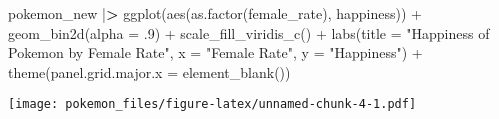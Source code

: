 \documentclass[
]{article}
\newenvironment{Shaded}{\begin{snugshade}}{\end{snugshade}}
\newcommand{\AttributeTok}[1]{\textcolor[rgb]{0.77,0.63,0.00}{#1}}
\newcommand{\DecValTok}[1]{\textcolor[rgb]{0.00,0.00,0.81}{#1}}
\newcommand{\ErrorTok}[1]{\textcolor[rgb]{0.64,0.00,0.00}{\textbf{#1}}}
\newcommand{\FunctionTok}[1]{\textcolor[rgb]{0.00,0.00,0.00}{#1}}
\newcommand{\NormalTok}[1]{#1}
\newcommand{\SpecialCharTok}[1]{\textcolor[rgb]{0.00,0.00,0.00}{#1}}
\newcommand{\StringTok}[1]{\textcolor[rgb]{0.31,0.60,0.02}{#1}}
\begin{document}
\begin{Shaded}
\begin{Highlighting}[]
\NormalTok{pokemon\_new }\SpecialCharTok{|}\ErrorTok{\textgreater{}} \FunctionTok{ggplot}\NormalTok{(}\FunctionTok{aes}\NormalTok{(}\FunctionTok{as.factor}\NormalTok{(female\_rate), happiness)) }\SpecialCharTok{+}
  \FunctionTok{geom\_bin2d}\NormalTok{(}\AttributeTok{alpha =}\NormalTok{ .}\DecValTok{9}\NormalTok{) }\SpecialCharTok{+}
  \FunctionTok{scale\_fill\_viridis\_c}\NormalTok{() }\SpecialCharTok{+}
  \FunctionTok{labs}\NormalTok{(}\AttributeTok{title =} \StringTok{"Happiness of Pokemon by Female Rate"}\NormalTok{, }\AttributeTok{x =} \StringTok{"Female Rate"}\NormalTok{, }\AttributeTok{y =} \StringTok{"Happiness"}\NormalTok{) }\SpecialCharTok{+}
  \FunctionTok{theme}\NormalTok{(}\AttributeTok{panel.grid.major.x =} \FunctionTok{element\_blank}\NormalTok{())}
\end{Highlighting}
\end{Shaded}

\texttt{[image: pokemon\_files/figure-latex/unnamed-chunk-4-1.pdf]}
\end{document}
